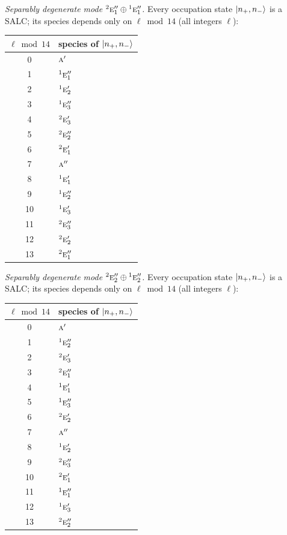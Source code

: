 \documentclass[11pt]{article}
\newcommand{\irr}[1]{\text{\normalfont\scshape #1}}
\newcommand{\conjpair}[1]{{}^{#1}}
\begin{document}
\emph{Separably degenerate mode $\conjpair{2}\irr{e}_{1}''\oplus \conjpair{1}\irr{e}_{1}''$.} Every occupation state $\ket{n_+,n_-}$ is a SALC; its species depends only on $\ell\bmod 14$ (all integers $\ell$):
\begin{longtable}{c l}\hline $\ell\bmod 14$ & species of $\ket{n_+,n_-}$\\ \hline\endhead
0 & $\irr{a}'$\\
1 & $\conjpair{1}\irr{e}_{1}''$\\
2 & $\conjpair{1}\irr{e}_{2}'$\\
3 & $\conjpair{1}\irr{e}_{3}''$\\
4 & $\conjpair{2}\irr{e}_{3}'$\\
5 & $\conjpair{2}\irr{e}_{2}''$\\
6 & $\conjpair{2}\irr{e}_{1}'$\\
7 & $\irr{a}''$\\
8 & $\conjpair{1}\irr{e}_{1}'$\\
9 & $\conjpair{1}\irr{e}_{2}''$\\
10 & $\conjpair{1}\irr{e}_{3}'$\\
11 & $\conjpair{2}\irr{e}_{3}''$\\
12 & $\conjpair{2}\irr{e}_{2}'$\\
13 & $\conjpair{2}\irr{e}_{1}''$\\
\hline\end{longtable}

\emph{Separably degenerate mode $\conjpair{2}\irr{e}_{2}''\oplus \conjpair{1}\irr{e}_{2}''$.} Every occupation state $\ket{n_+,n_-}$ is a SALC; its species depends only on $\ell\bmod 14$ (all integers $\ell$):
\begin{longtable}{c l}\hline $\ell\bmod 14$ & species of $\ket{n_+,n_-}$\\ \hline\endhead
0 & $\irr{a}'$\\
1 & $\conjpair{1}\irr{e}_{2}''$\\
2 & $\conjpair{2}\irr{e}_{3}'$\\
3 & $\conjpair{2}\irr{e}_{1}''$\\
4 & $\conjpair{1}\irr{e}_{1}'$\\
5 & $\conjpair{1}\irr{e}_{3}''$\\
6 & $\conjpair{2}\irr{e}_{2}'$\\
7 & $\irr{a}''$\\
8 & $\conjpair{1}\irr{e}_{2}'$\\
9 & $\conjpair{2}\irr{e}_{3}''$\\
10 & $\conjpair{2}\irr{e}_{1}'$\\
11 & $\conjpair{1}\irr{e}_{1}''$\\
12 & $\conjpair{1}\irr{e}_{3}'$\\
13 & $\conjpair{2}\irr{e}_{2}''$\\
\hline\end{longtable}
\end{document}

